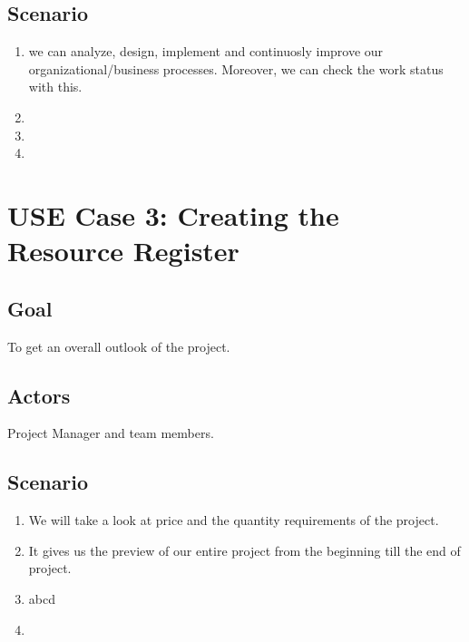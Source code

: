 \documentclass[10pt]{article}
\begin{document}
\subsection{Scenario}
\begin{enumerate}
\item we can analyze, design, implement and continuosly improve our organizational/business processes. Moreover, we can check the work status with this.
\item
\item
\item
\end{enumerate}

\section{USE Case 3: Creating the Resource Register}
\subsection{Goal}
 To get an overall outlook of the project.
\subsection{Actors}
Project Manager and team members.
\subsection{Scenario}

\begin{enumerate}
\item We will take a look at price and the quantity requirements of the project.
\item It gives us the preview of our entire project from the beginning till the end of project.
\item abcd
\item 
\end{enumerate}
\end{document}
